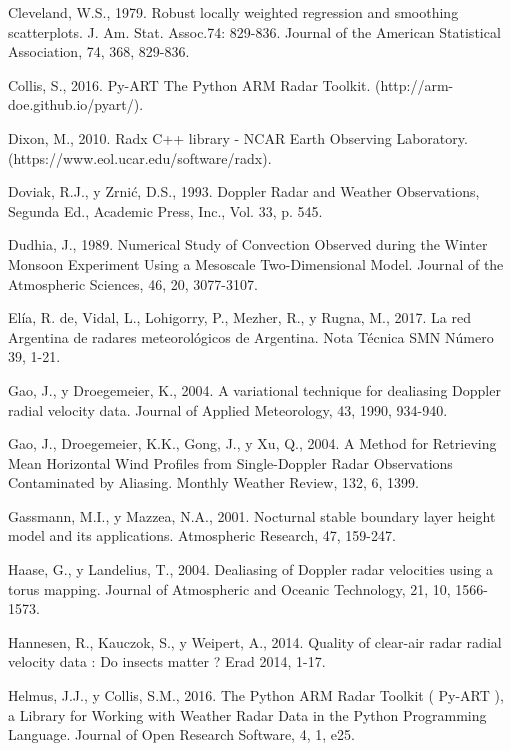 \documentclass[12pt,spanish,oneside, a4paper]{book}
\begin{document}
\hypertarget{ref-Cleveland1979}{}
Cleveland, W.S., 1979. Robust locally weighted regression and smoothing
scatterplots. J. Am. Stat. Assoc.74: 829-836. Journal of the American
Statistical Association, 74, 368, 829-836.

\hypertarget{ref-Collis2016}{}
Collis, S., 2016. Py-ART The Python ARM Radar Toolkit.
(http://arm-doe.github.io/pyart/).

\hypertarget{ref-Dixon2010}{}
Dixon, M., 2010. Radx C++ library - NCAR Earth Observing Laboratory.
(https://www.eol.ucar.edu/software/radx).

\hypertarget{ref-Doviak1993}{}
Doviak, R.J., y Zrnić, D.S., 1993. Doppler Radar and Weather
Observations, Segunda Ed., Academic Press, Inc., Vol. 33, p. 545.

\hypertarget{ref-Dudhia1989}{}
Dudhia, J., 1989. Numerical Study of Convection Observed during the
Winter Monsoon Experiment Using a Mesoscale Two-Dimensional Model.
Journal of the Atmospheric Sciences, 46, 20, 3077-3107.

\hypertarget{ref-DeElia2017}{}
Elía, R. de, Vidal, L., Lohigorry, P., Mezher, R., y Rugna, M., 2017. La
red Argentina de radares meteorológicos de Argentina. Nota Técnica SMN
Número 39, 1-21.

\hypertarget{ref-Gao2004}{}
Gao, J., y Droegemeier, K., 2004. A variational technique for dealiasing
Doppler radial velocity data. Journal of Applied Meteorology, 43, 1990,
934-940.

\hypertarget{ref-Gao2004a}{}
Gao, J., Droegemeier, K.K., Gong, J., y Xu, Q., 2004. A Method for
Retrieving Mean Horizontal Wind Profiles from Single-Doppler Radar
Observations Contaminated by Aliasing. Monthly Weather Review, 132, 6,
1399.

\hypertarget{ref-Gassmann2001}{}
Gassmann, M.I., y Mazzea, N.A., 2001. Nocturnal stable boundary layer
height model and its applications. Atmospheric Research, 47, 159-247.

\hypertarget{ref-Haase2004}{}
Haase, G., y Landelius, T., 2004. Dealiasing of Doppler radar velocities
using a torus mapping. Journal of Atmospheric and Oceanic Technology,
21, 10, 1566-1573.

\hypertarget{ref-Hannesen2014}{}
Hannesen, R., Kauczok, S., y Weipert, A., 2014. Quality of clear-air
radar radial velocity data : Do insects matter ? Erad 2014, 1-17.

\hypertarget{ref-Helmus2016}{}
Helmus, J.J., y Collis, S.M., 2016. The Python ARM Radar Toolkit (
Py-ART ), a Library for Working with Weather Radar Data in the Python
Programming Language. Journal of Open Research Software, 4, 1, e25.
\end{document}
